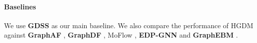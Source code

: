 \documentclass[letterpaper]{article} %
\begin{document}
\paragraph{Baselines}
We use \textbf{GDSS} \cite{jo2022score} as our main baseline. We also compare the performance of HGDM against \textbf{GraphAF} \cite{shi2020graphaf}, \textbf{GraphDF} \cite{luo2021graphdf}, MoF\textbf{}low \cite{zang2020moflow}, \textbf{EDP-GNN} \cite{niu2020permutation} and \textbf{GraphEBM} \cite{liu2021graphebm}.
\begin{table}
\Huge
  \centering
  \caption{Generation results of the variants of GDSS and HGDM on the QM9 dataset.}
  \label{Ablation}
\end{table}
\end{document}
